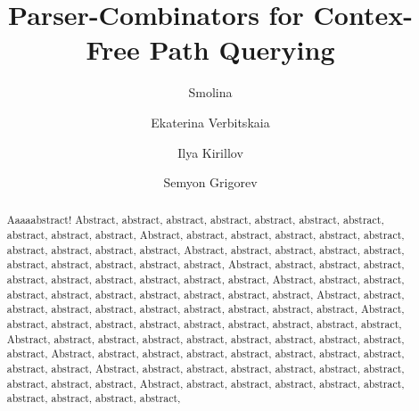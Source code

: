 \documentclass[sigconf]{acmart}
\begin{document}
\title{Parser-Combinators for Contex-Free Path Querying}


\author{Smolina}

\author{Ekaterina Verbitskaia}

\author{Ilya Kirillov}

\author{Semyon Grigorev}

\renewcommand{\shortauthors}{Smolina et al.}

\begin{abstract}
Aaaaabstract! Abstract, abstract, abstract, abstract, abstract, abstract, abstract, abstract, abstract, abstract,
Abstract, abstract, abstract, abstract, abstract, abstract, abstract, abstract, abstract, abstract,
Abstract, abstract, abstract, abstract, abstract, abstract, abstract, abstract, abstract, abstract,
Abstract, abstract, abstract, abstract, abstract, abstract, abstract, abstract, abstract, abstract,
Abstract, abstract, abstract, abstract, abstract, abstract, abstract, abstract, abstract, abstract,
Abstract, abstract, abstract, abstract, abstract, abstract, abstract, abstract, abstract, abstract,
Abstract, abstract, abstract, abstract, abstract, abstract, abstract, abstract, abstract, abstract,
Abstract, abstract, abstract, abstract, abstract, abstract, abstract, abstract, abstract, abstract,
Abstract, abstract, abstract, abstract, abstract, abstract, abstract, abstract, abstract, abstract,
Abstract, abstract, abstract, abstract, abstract, abstract, abstract, abstract, abstract, abstract,
Abstract, abstract, abstract, abstract, abstract, abstract, abstract, abstract, abstract, abstract,
\end{abstract}
\end{document}
